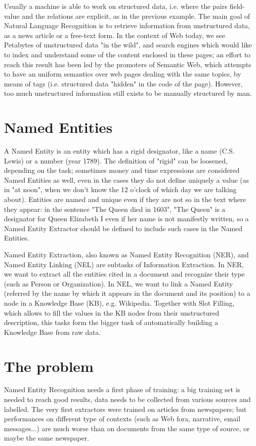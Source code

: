 \documentclass[a4paper,11pt]{report}
\begin{document}
Usually a machine is able to work on structured data, i.e. where the pairs field-value and the relations are explicit, as in the previous example. The main goal of Natural Language Recognition is to retrieve information from unstructured data, as a news article or a free-text form. In the context of Web today, we see Petabytes of unstructured data "in the wild", and search engines which would like to index and understand some of the content enclosed in these pages; an effort to reach this result has been led by the promoters of Semantic Web, which attempts to have an uniform semantics over web pages dealing with the same topics, by means of tags (i.e. structured data "hidden" in the code of the page). However, too much unstructured information still exists to be manually structured by man.

\section{Named Entities}
A Named Entity is an entity which has a rigid designator, like a name (C.S. Lewis) or a number (year 1789). The definition of "rigid" can be loosened, depending on the task; sometimes money and time expressions are considered Named Entities as well, even in the cases they do not define uniquely a value (as in "at noon", when we don't know the 12 o'clock of which day we are talking about). Entities are named and unique even if they are not so in the text where they appear: in the sentence "The Queen died in 1603", "The Queen" is a designator for Queen Elizabeth I even if her name is not manifestly written, so a Named Entity Extractor should be defined to include such cases in the Named Entities.

Named Entity Extraction, also known as Named Entity Recognition (NER), and Named Entity Linking (NEL) are subtasks of Information Extraction. In NER, we want to extract all the entities cited in a document and recognize their type (such as Person or Organization). In NEL, we want to link a Named Entity (referred by the name by which it appears in the document and its position) to a node in a Knowledge Base (KB), e.g. Wikipedia. Together with Slot Filling, which allows to fill the values in the KB nodes from their unstructured description, this tasks form the bigger task of automatically building a Knowledge Base from raw data.

\section{The problem}
Named Entity Recognition needs a first phase of training: a big training set is needed to reach good results, data needs to be collected from various sources and labelled. The very first extractors were trained on articles from newspapers; but performances on different type of contexts (such as Web fora, narrative, email messages...) are much worse than on documents from the same type of source, or maybe the same newspaper.
\end{document}

